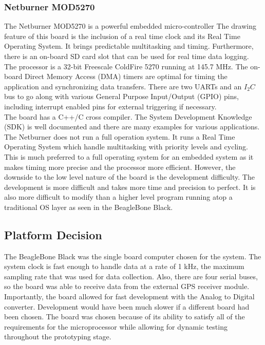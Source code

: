 \subsubsection{Netburner MOD5270}
\label{subsec:MOD5270}
\indent The Netburner MOD5270 is a powerful embedded
micro-controller The drawing feature of this board is the inclusion
of a real time clock and its Real Time Operating System. It brings
predictable multitasking and timing. Furthermore, there is an
on-board SD card slot that can be used for real time data
logging. The processor is a 32-bit Freescale ColdFire 5270
running at 145.7 MHz. The on-board Direct Memory Access (DMA)
timers are optimal for timing the application and
synchronizing data transfers. There are two UARTs and an
$I_2C$ bus to go along with various General Purpose
Input/Output (GPIO) pins, including interrupt enabled pins
for external triggering if necessary. \\

\indent The board has a C++/C cross compiler. The System Development
Knowledge (SDK) is well documented and there are many examples for
various applications. The Netburner does not run a full operation
system. It runs a Real Time Operating System which
handle multitasking with priority levels and cycling. This is
much preferred to a full operating system for an embedded system
as it makes timing more precise and the processor more
efficient. However, the downside to the low level nature of
the board is the development difficulty. The development is
more difficult and takes more time and precision to
perfect. It is also more difficult to modify than a higher
level program running atop a traditional OS layer as seen
in the BeagleBone Black.

\subsection{Platform Decision}

The BeagleBone Black was the single board computer chosen for the
system. The system clock is fast enough to handle data at a rate of
1 kHz, the maximum sampling rate that was used for data
collection. Also, there are four serial buses, so the board was
able to receive data from the external GPS receiver module.
Importantly, the board allowed for fast development with the
Analog to Digital converter. Development would have
been much slower if a different board had been chosen. The
board was chosen because of its ability to satisfy all of the
requirements for the microprocessor while allowing for
dynamic testing throughout the prototyping stage. 
